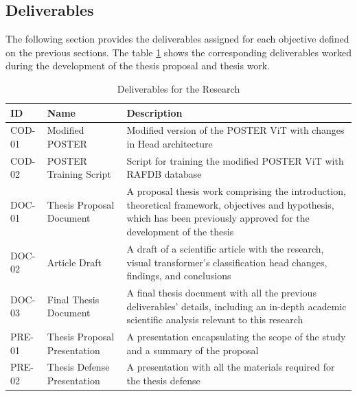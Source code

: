 \subsection{Deliverables}


The following section provides the deliverables assigned for each objective defined on the previous sections. The table \ref{tab:table_deliverables} shows the corresponding deliverables worked during the development of the thesis proposal and thesis work.



\renewcommand{\arraystretch}{2.5}
\begin{table}[H]
\caption{Deliverables for the Research}
\label{tab:table_deliverables}
\begin{tabular}{@{}llp{10cm}@{}}
\toprule
\textbf{ID} & \textbf{Name} & \textbf{Description} \\ \midrule
COD-01 & Modified POSTER & 
\parbox[t]{10cm}{Modified version of the POSTER ViT with changes in Head architecture} \\
COD-02 & POSTER Training Script & 
\parbox[t]{10cm}{Script for training the modified POSTER ViT with RAFDB database} \\
DOC-01 & Thesis Proposal Document & 
\parbox[t]{10cm}{A proposal thesis work comprising the introduction, theoretical framework, objectives and hypothesis, which has been previously approved for the development of the thesis} \\
DOC-02 & Article Draft & 
\parbox[t]{10cm}{A draft of a scientific article with the research, visual transformer's classification head changes, findings, and conclusions} \\
DOC-03 & Final Thesis Document & 
\parbox[t]{10cm}{A final thesis document with all the previous deliverables' details, including an in-depth academic scientific analysis relevant to this research} \\
PRE-01 & Thesis Proposal Presentation & 
\parbox[t]{10cm}{A presentation encapsulating the scope of the study and a summary of the proposal} \\
PRE-02 & Thesis Defense Presentation & 
\parbox[t]{10cm}{A presentation with all the materials required for the thesis defense} \\ 
\bottomrule
\end{tabular}
\end{table}


